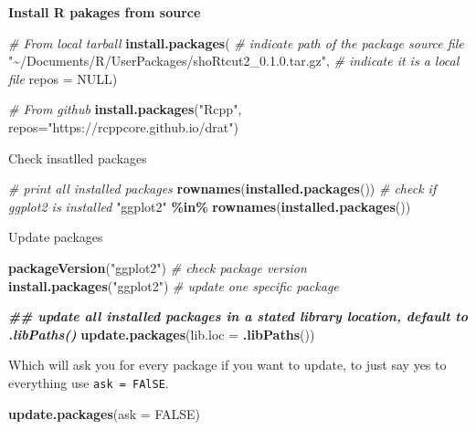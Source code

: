 \documentclass[
]{book}
\newenvironment{Shaded}{\begin{snugshade}}{\end{snugshade}}
\newcommand{\AttributeTok}[1]{\textcolor[rgb]{0.13,0.29,0.53}{#1}}
\newcommand{\CommentTok}[1]{\textcolor[rgb]{0.56,0.35,0.01}{\textit{#1}}}
\newcommand{\ConstantTok}[1]{\textcolor[rgb]{0.56,0.35,0.01}{#1}}
\newcommand{\DocumentationTok}[1]{\textcolor[rgb]{0.56,0.35,0.01}{\textbf{\textit{#1}}}}
\newcommand{\FunctionTok}[1]{\textcolor[rgb]{0.13,0.29,0.53}{\textbf{#1}}}
\newcommand{\NormalTok}[1]{#1}
\newcommand{\SpecialCharTok}[1]{\textcolor[rgb]{0.81,0.36,0.00}{\textbf{#1}}}
\newcommand{\StringTok}[1]{\textcolor[rgb]{0.31,0.60,0.02}{#1}}
\begin{document}
\textbf{Install R pakages from source}

\begin{Shaded}
\begin{Highlighting}[]
\CommentTok{\# From local tarball}
\FunctionTok{install.packages}\NormalTok{(}
  \CommentTok{\# indicate path of the package source file}
  \StringTok{"\textasciitilde{}/Documents/R/UserPackages/shoRtcut2\_0.1.0.tar.gz"}\NormalTok{, }
  \CommentTok{\# indicate it is a local file}
  \AttributeTok{repos =} \ConstantTok{NULL}\NormalTok{)}

\CommentTok{\# From github}
\FunctionTok{install.packages}\NormalTok{(}\StringTok{"Rcpp"}\NormalTok{, }\AttributeTok{repos=}\StringTok{"https://rcppcore.github.io/drat"}\NormalTok{)}
\end{Highlighting}
\end{Shaded}

Check insatlled packages

\begin{Shaded}
\begin{Highlighting}[]
\CommentTok{\# print all installed packages}
\FunctionTok{rownames}\NormalTok{(}\FunctionTok{installed.packages}\NormalTok{())}
\CommentTok{\# check if \textasciigrave{}ggplot2\textasciigrave{} is installed}
\StringTok{"ggplot2"} \SpecialCharTok{\%in\%} \FunctionTok{rownames}\NormalTok{(}\FunctionTok{installed.packages}\NormalTok{())}
\end{Highlighting}
\end{Shaded}

Update packages

\begin{Shaded}
\begin{Highlighting}[]
\FunctionTok{packageVersion}\NormalTok{(}\StringTok{"ggplot2"}\NormalTok{) }\CommentTok{\# check package version}
\FunctionTok{install.packages}\NormalTok{(}\StringTok{"ggplot2"}\NormalTok{) }\CommentTok{\# update one specific package}

\DocumentationTok{\#\# update all installed packages in a stated library location, default to \textasciigrave{}.libPaths()\textasciigrave{}}
\FunctionTok{update.packages}\NormalTok{(}\AttributeTok{lib.loc =} \FunctionTok{.libPaths}\NormalTok{()) }
\end{Highlighting}
\end{Shaded}

Which will ask you for every package if you want to update, to just say yes to everything use \texttt{ask\ =\ FAlSE}.

\begin{Shaded}
\begin{Highlighting}[]
\FunctionTok{update.packages}\NormalTok{(}\AttributeTok{ask =} \ConstantTok{FALSE}\NormalTok{)}
\end{Highlighting}
\end{Shaded}
\end{document}

